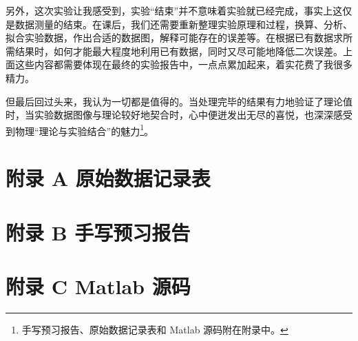 \documentclass[UTF8]{article}
\theoremstyle{MyLineTheoremStyle} %
\theoremstyle{MyBlockTheoremStyle} %
\theoremstyle{MySubsubsectionStyle} %
\begin{document}
另外，这次实验让我感受到，实验“结束”并不意味着实验就已经完成，事实上这仅是数据测量的结束。在课后，我们还需要重新整理实验原理和过程，换算、分析、拟合实验数据，作出合适的数据图，解释可能存在的误差等。在根据已有数据求所需结果时，如何才能最大程度地利用已有数据，同时又尽可能地降低二次误差。上面这些内容都需要体现在最终的实验报告中，一点点累加起来，着实花费了我很多精力。

但最后回过头来，我认为一切都是值得的。当处理完毕的结果有力地验证了理论值时，当实验数据图像与理论较好地契合时，心中便迸发出无尽的喜悦，也深深感受到物理“理论与实验结合”的魅力\footnote{手写预习报告、原始数据记录表和 Matlab 源码附在附录中。}。

\newpage
\section*{附录 A\hspace*{20pt} 原始数据记录表}
\thispagestyle{fancy} 

\begin{figure}[H]\centering
    
\end{figure}


\section*{附录 B\hspace*{20pt} 手写预习报告}
\thispagestyle{fancy} 

\begin{figure}[H]\centering
    
\end{figure}


\section*{附录 C\hspace*{20pt} Matlab 源码}
\thispagestyle{fancy} 

\end{document}
